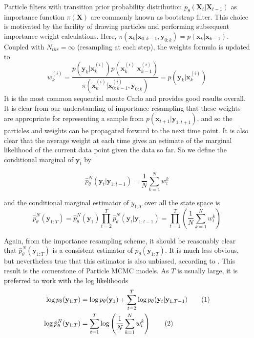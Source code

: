 \documentclass[11pt,a4,twosided,singlespacing,titlepagenumber=on]{scrreprt}
\numberwithin{equation}{chapter} %
\theoremstyle{remark}
\newcommand{\matr}[1]{\mathbf{#1}}
\newcommand\numberthis{\addtocounter{equation}{1}\tag{\theequation}}
\begin{document}
Particle filters with transition prior probability distribution $p_\theta(\matr{X}_t | \matr{X}_{t-1})$ as importance function $\pi(\matr{X})$ are commonly known as bootstrap filter. This choice is motivated by the facility of drawing particles and performing subsequent importance weight calculations. Here, $\pi(\matr{x}_k| \matr{x}_{0:k-1}, \matr{y}_{0:k}) = p(\matr{x}_k|\matr{x}_{k-1})$. Coupled with $N_{thr} = \infty$ (resampling at each step), the weights formula is updated to
\begin{equation}
w_k^{(i)} = \frac{p(\matr{y}_k|\matr{x}_k^{(i)})p(\matr{x}_k^{(i)}|\matr{x}^{(i)}_{k-1})}{\pi(\matr{x}_k^{(i)}|\matr{x}^{(i)}_{0:k-1},\matr{y}_{0:k})}=  p(\matr{y}_k|\matr{x}_k^{(i)})
\end{equation}
It is the most common sequential monte Carlo and provides good results overall. \\
It is clear from our understanding of importance resampling that these weights are appropriate for representing a sample from $p(\matr{x}_{t+1}|\matr{y}_{1:t+1})$, and so the particles and weights can be propagated forward to the next time point. It is also clear that the average weight at each time gives an estimate of the marginal likelihood of the current data point given the data so far. So we define the conditional marginal of $\matr{y}_t$ by

\begin{equation}
 \hat{p}^N_{\theta}(\matr{y}_t | \matr{y}_{1:t-1}) = \frac{1}{N} \sum_{k=1}^N w_t^k
\end{equation}

and the conditional marginal estimator of $y_{1:T}$ over all the state space is
\begin{equation}
 \hat{p}^N_\theta(\matr{y}_{1:T}) = \hat{p}^N_\theta(\matr{y}_1)\prod_{t=2}^T \hat{p}^N_\theta(\matr{y}_t | \matr{y}_{1:t-1}) = \prod_{t=1}^T \left( \frac{1}{N} \sum_{k=1}^N w_t^k \right)
\end{equation}

Again, from the importance resampling scheme, it should be reasonably clear that $\hat{p}^N_{\theta}(\matr{y}_{1:T})$ is a consistent estimator of $p_{\theta}(\matr{y}_{1:T})$. It is much less obvious, but nevertheless true that this estimator is also unbiased, according to \cite{delmoral2004}. This result is the cornerstone of Particle MCMC models. As $T$ is usually large, it is preferred to work with the log likelihoods
\begin{align*}
\log p_{\theta}(\matr{y}_{1:T}) &= \log p_\theta(\matr{y}_1) + \sum_{t=2}^T \log p_\theta(\matr{y}_t | \matr{y}_{1:T-1}) \numberthis \\
\log \hat{p}^N_\theta(\matr{y}_{1:T}) &= \sum_{t=1}^T \log \left(\frac{1}{N} \sum_{k=1}^N w_t^{k} \right) \numberthis
\end{align*}
\end{document}
